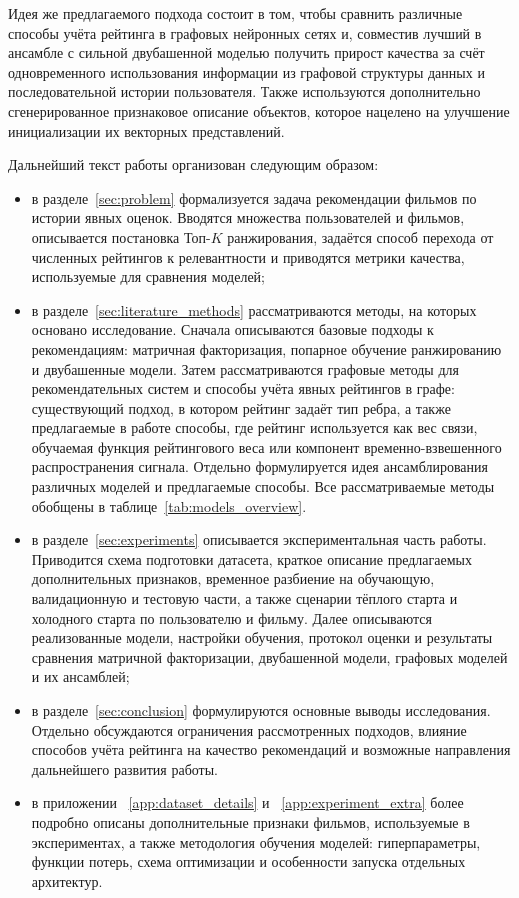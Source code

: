 \documentclass[12pt,fleqn]{article}
\begin{document}
Идея же предлагаемого подхода состоит в том, чтобы сравнить различные способы учёта рейтинга в графовых нейронных сетях и, совместив лучший в ансамбле с сильной двубашенной моделью получить прирост качества за счёт одновременного использования информации из графовой структуры данных и последовательной истории пользователя. Также используются дополнительно сгенерированное признаковое описание объектов, которое нацелено на улучшение инициализации их векторных представлений.

Дальнейший текст работы организован следующим образом:
\begin{itemize}
    \item в разделе~\ref{sec:problem} формализуется задача рекомендации фильмов
    по истории явных оценок. Вводятся множества пользователей и фильмов,
    описывается постановка Топ-$K$ ранжирования, задаётся способ перехода от
    численных рейтингов к релевантности и приводятся метрики качества,
    используемые для сравнения моделей;

    \item в разделе~\ref{sec:literature_methods} рассматриваются методы, на
    которых основано исследование. Сначала описываются базовые подходы к
    рекомендациям: матричная факторизация, попарное обучение ранжированию и
    двубашенные модели. Затем рассматриваются графовые методы для
    рекомендательных систем и способы учёта явных рейтингов в графе:
    существующий подход, в котором рейтинг задаёт тип ребра, а также
    предлагаемые в работе способы, где рейтинг используется как вес связи,
    обучаемая функция рейтингового веса или компонент временно-взвешенного
    распространения сигнала. Отдельно формулируется идея ансамблирования
    различных моделей и предлагаемые способы. Все рассматриваемые методы обобщены в
    таблице~\ref{tab:models_overview}.

    \item в разделе~\ref{sec:experiments} описывается экспериментальная часть
    работы. Приводится схема подготовки датасета, краткое описание предлагаемых дополнительных признаков, временное разбиение
    на обучающую, валидационную и тестовую части, а также сценарии тёплого
    старта и холодного старта по пользователю и фильму. Далее описываются
    реализованные модели, настройки обучения, протокол оценки и результаты
    сравнения матричной факторизации, двубашенной модели, графовых моделей и их
    ансамблей;

    \item в разделе~\ref{sec:conclusion} формулируются основные выводы
    исследования. Отдельно обсуждаются ограничения рассмотренных подходов,
    влияние способов учёта рейтинга на качество рекомендаций и возможные
    направления дальнейшего развития работы.

    \item в приложении ~\ref{app:dataset_details} и ~\ref{app:experiment_extra} более подробно описаны дополнительные признаки фильмов,
используемые в экспериментах, а также методология обучения моделей:
гиперпараметры, функции потерь, схема оптимизации и особенности запуска
отдельных архитектур.

\end{itemize}
\end{document}
